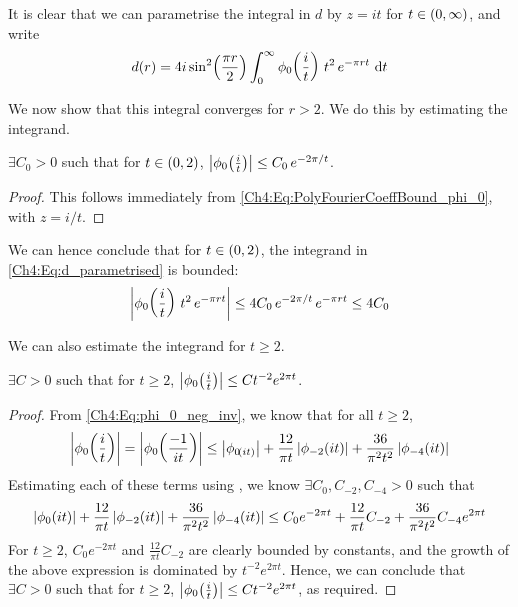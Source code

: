 It is clear that we can parametrise the integral in $d$ by $z = it$ for $t \in \left( 0, \infty \right)$, and write
\begin{align}
    d(r) = 4i \sin^2\!\left( \frac{\pi r}{2} \right) \int_{0}^{\infty} \phi_0\!\left( \frac{i}{t} \right) \, t^2 \, e^{-\pi r t} \, \operatorname{d}\!{t}
    \label{Ch4:Eq:d_parametrised}
\end{align}

We now show that this integral converges for $r > 2$. We do this by estimating the integrand.

\begin{boxlemma}
    $\exists C_0 > 0$ such that for $t \in \left( 0, 2 \right)$, $\left\lvert \phi_0\!\left( \frac{i}{t} \right) \right\rvert \leq C_0 \, e^{-2\pi/t}$.
\end{boxlemma}
\begin{proof}
    This follows immediately from \eqref{Ch4:Eq:PolyFourierCoeffBound_phi_0}, with $z = i/t$.
\end{proof}

We can hence conclude that for $t \in \left( 0, 2 \right)$, the integrand in \eqref{Ch4:Eq:d_parametrised} is bounded:
\begin{align*}
    \left\lvert \phi_0\!\left( \frac{i}{t} \right) \, t^2 \, e^{-\pi r t} \right\rvert 
    \leq 4 C_0 \, e^{-2\pi / t} \, e^{-\pi r t}
    \leq 4 C_0
\end{align*}

We can also estimate the integrand for $t \geq 2$.

\begin{boxlemma}\label{Ch4:Lemma:d_integral_estimate_above}
    $\exists C > 0$ such that for $t \geq 2$, $\left\lvert \phi_{0}\!\left( \frac{i}{t} \right) \right\rvert \leq C t^{-2} e^{2\pi t}$.
\end{boxlemma}
\begin{proof}
    From \eqref{Ch4:Eq:phi_0_neg_inv}, we know that for all $t \geq 2$,
    \begin{align*}
        \left\lvert \phi_0\!\left( \frac{i}{t} \right) \right\rvert
        = \left\lvert \phi_{0}\!\left( \frac{-1}{it} \right) \right\rvert
        \leq \left\lvert \phi_{0\!\left( it \right)} \right\rvert + \frac{12}{\pi t} \left\lvert \phi_{-2}\!\left( it \right) \right\rvert + \frac{36}{\pi^2 t^2} \left\lvert \phi_{-4}\!\left( it \right) \right\rvert
    \end{align*}
    Estimating each of these terms using , we know $\exists C_0, C_{-2}, C_{-4} > 0$ such that
    \begin{align*}
        \left\lvert \phi_{0}\!\left( it \right) \right\rvert + \frac{12}{\pi t} \left\lvert \phi_{-2}\!\left( it \right) \right\rvert + \frac{36}{\pi^2 t^2} \left\lvert \phi_{-4}\!\left( it \right) \right\rvert
        \leq C_0 e^{-2 \pi t} + \frac{12}{\pi t} C_{-2} + \frac{36}{\pi^2 t^2} C_{-4} e^{2 \pi t}
    \end{align*}
    For $t \geq 2$, $C_0 e^{-2 \pi t}$ and $\frac{12}{\pi t} C_{-2}$ are clearly bounded by constants, and the growth of the above expression is dominated by $t^{-2} e^{2\pi t}$. Hence, we can conclude that $\exists C > 0$ such that for $t \geq 2$, $\left\lvert \phi_0\!\left( \frac{i}{t} \right) \right\rvert \leq C t^{-2} e^{2 \pi t}$, as required.
\end{proof}

